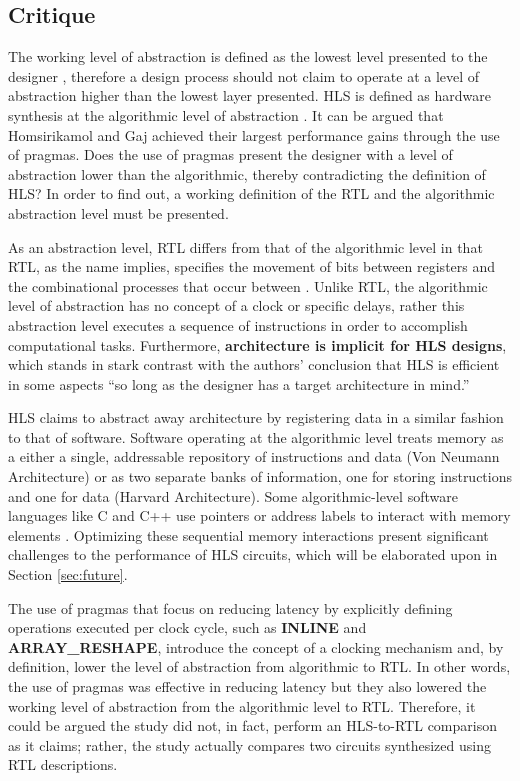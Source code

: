 \documentclass[12pt,journal,compsoc,onecolumn]{IEEEtran}
\begin{document}
\subsection{Critique}
The working level of abstraction is defined as the lowest level presented to the designer \cite{Harris+Harris}, therefore a design process should not claim to operate at a level of abstraction higher than the lowest layer presented. HLS is defined as hardware synthesis at the algorithmic level of abstraction \cite{3}\cite{4}. It can be argued that Homsirikamol and Gaj achieved their largest performance gains through the use of pragmas. Does the use of pragmas present the designer with a level of abstraction lower than the algorithmic, thereby contradicting the definition of HLS? In order to find out, a working definition of the RTL and the algorithmic abstraction level must be presented.

As an abstraction level, RTL differs from that of the algorithmic level in that RTL, as the name implies, specifies the movement of bits between registers and the combinational processes that occur between \cite{churtl}. Unlike RTL, the algorithmic level of abstraction has no concept of a clock or specific delays, rather this abstraction level executes a sequence of instructions in order to accomplish computational tasks\cite{churtl}. Furthermore, \textbf{architecture is implicit for HLS designs}\cite{bsv}, which stands in stark contrast with the authors' conclusion that HLS is efficient in some aspects ``so long as the designer has a target architecture in mind.'' 

HLS claims to abstract away architecture by registering data in a similar fashion to that of software\cite{legup}. Software operating at the algorithmic level treats memory as a either a single, addressable repository of instructions and data (Von Neumann Architecture) or as two separate banks of information, one for storing instructions and one for data (Harvard Architecture). Some algorithmic-level software languages like C and C++ use pointers or address labels to interact with memory elements \cite{cpointers}. Optimizing these sequential memory interactions present significant challenges to the performance of HLS circuits, which will be elaborated upon in Section \ref{sec:future}.

The use of pragmas that focus on reducing latency by explicitly defining operations executed per clock cycle, such as \textbf{INLINE} and \textbf{ARRAY\_RESHAPE}, introduce the concept of a clocking mechanism and, by definition, lower the level of abstraction from algorithmic to RTL. In other words, the use of pragmas was effective in reducing latency but they also lowered the working level of abstraction from the algorithmic level to RTL. Therefore, it could be argued the study did not, in fact, perform an HLS-to-RTL comparison as it claims; rather, the study actually compares two circuits synthesized using RTL descriptions. 
\end{document}
